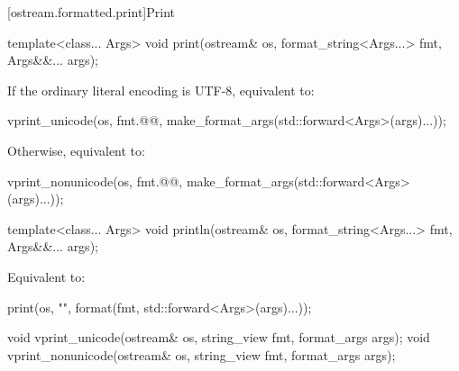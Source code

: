 [ostream.formatted.print]{Print}

%
\begin{itemdecl}
template<class... Args>
  void print(ostream& os, format_string<Args...> fmt, Args&&... args);
\end{itemdecl}

\begin{itemdescr}
\pnum
\effects
If the ordinary literal encoding is UTF-8, equivalent to:
\begin{codeblock}
vprint_unicode(os, fmt.@@, make_format_args(std::forward<Args>(args)...));
\end{codeblock}
Otherwise, equivalent to:
\begin{codeblock}
vprint_nonunicode(os, fmt.@@, make_format_args(std::forward<Args>(args)...));
\end{codeblock}
\end{itemdescr}

%
\begin{itemdecl}
template<class... Args>
  void println(ostream& os, format_string<Args...> fmt, Args&&... args);
\end{itemdecl}

\begin{itemdescr}
\pnum
\effects
Equivalent to:
\begin{codeblock}
print(os, "{}\n", format(fmt, std::forward<Args>(args)...));
\end{codeblock}
\end{itemdescr}

%
%
\begin{itemdecl}
void vprint_unicode(ostream& os, string_view fmt, format_args args);
void vprint_nonunicode(ostream& os, string_view fmt, format_args args);
\end{itemdecl}


